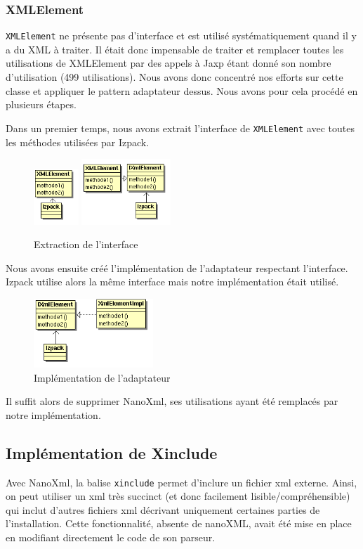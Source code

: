 \subsubsection{XMLElement}
\verb|XMLElement| ne présente pas d'interface et est utilisé systématiquement quand il y a du XML à traiter.
Il était donc impensable de traiter et remplacer toutes les utilisations de XMLElement par des appels à Jaxp étant donné son nombre d'utilisation (499 utilisations).
Nous avons donc concentré nos efforts sur cette classe et appliquer le pattern adaptateur dessus.
Nous avons pour cela procédé en plusieurs étapes.

Dans un premier temps, nous avons extrait l'interface de \verb|XMLElement| avec toutes les méthodes utilisées par Izpack.
\begin{figure}[H]
	\centering
	\includegraphics[width=0.15\textwidth]{../image/sol_casInitial.png}
	\hfil
	\includegraphics[width=0.3\textwidth]{../image/sol_extractionInterface.png}
	\caption{Extraction de l'interface}
\end{figure}
Nous avons ensuite créé l'implémentation de l'adaptateur respectant l'interface.
Izpack utilise alors la même interface mais notre implémentation était utilisé.
\begin{figure}[H]
	\centering
	\includegraphics[width=0.4\textwidth]{../image/sol_implementation.png}
	\caption{Implémentation de l'adaptateur}
\end{figure}
Il suffit alors de supprimer NanoXml, ses utilisations ayant été remplacés par notre implémentation.
\subsection{Implémentation de Xinclude}
Avec NanoXml, la balise \verb|xinclude| permet d'inclure un fichier xml externe.
Ainsi, on peut utiliser un xml très succinct (et donc facilement lisible/compréhensible) qui inclut d'autres fichiers xml décrivant uniquement certaines parties de l'installation.
Cette fonctionnalité, absente de nanoXML, avait été mise en place en modifiant directement le code de son parseur.

